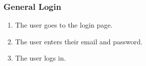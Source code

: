 \subsubsection{General Login}

\begin{enumerate}
    \item The user goes to the login page.
    \item The user enters their email and password.
    \item The user logs in.
\end{enumerate}